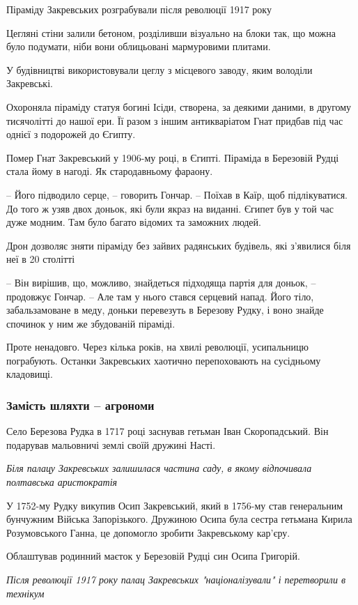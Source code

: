 Піраміду Закревських розграбували після революції 1917 року

Цегляні стіни залили бетоном, розділивши візуально на блоки так, що можна було
подумати, ніби вони облицьовані мармуровими плитами.

У будівництві використовували цеглу з місцевого заводу, яким володіли
Закревські.

Охороняла піраміду статуя богині Ісіди, створена, за деякими даними, в другому
тисячолітті до нашої ери. Її разом з іншим антикваріатом Гнат придбав під час
однієї з подорожей до Єгипту.

Помер Гнат Закревський у 1906-му році, в Єгипті. Піраміда в Березовій Рудці
стала йому в нагоді. Як стародавньому фараону.  

– Його підводило серце, – говорить Гончар. – Поїхав в Каїр, щоб підлікуватися.
До того ж узяв двох доньок, які були якраз на виданні. Єгипет був у той час
дуже модним. Там було багато відомих та заможних людей. 

Дрон дозволяє зняти піраміду без зайвих радянських будівель, які з'явилися біля
неї в 20 столітті

–  Він вирішив, що, можливо, знайдеться підходяща партія для доньок, –
продовжує Гончар. –  Але там у нього стався серцевий напад. Його тіло,
забальзамоване в меду, доньки перевезуть в Березову Рудку, і воно знайде
спочинок у ним же збудованій піраміді.

Проте ненадовго. Через кілька років, на хвилі революції, усипальницю
пограбують. Останки Закревських хаотично перепоховають на сусідньому кладовищі.

\subsubsection{Замість шляхти – агрономи}

Село Березова Рудка в 1717 році заснував гетьман Іван Скоропадський. Він
подарував мальовничі землі своїй дружині Насті.

\emph{Біля палацу Закревських залишилася частина саду, в якому відпочивала полтавська
аристократія}

У 1752-му Рудку викупив Осип Закревський, який в 1756-му став генеральним
бунчужним Війська Запорізького. Дружиною Осипа була сестра гетьмана Кирила
Розумовського Ганна, це допомогло зробити Закревському кар'єру.

Облаштував родинний маєток у Березовій Рудці син Осипа Григорій.

\emph{Після революції 1917 року палац Закревських "націоналізували" і перетворили в технікум}


